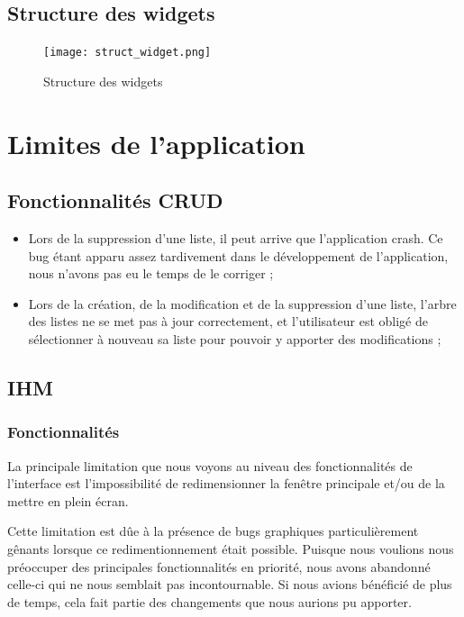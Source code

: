 	\newpage
	\section{Structure des widgets}
	
		\begin{figure}[h!]
			\centering
		   \texttt{[image: struct\_widget.png]}
		   \caption{Structure des widgets}
		\end{figure}
		\FloatBarrier
		
		
		
	
\chapter{Limites de l'application}
	
	\section{Fonctionnalités CRUD}
	
		\begin{itemize}
			\item Lors de la suppression d'une liste, il peut arrive que l'application crash. Ce bug étant apparu assez tardivement dans le développement de l'application, nous n'avons pas eu le temps de le corriger ;
			\item Lors de la création, de la modification et de la suppression d'une liste, l'arbre des listes ne se met pas à jour correctement, et l'utilisateur est obligé de sélectionner à nouveau sa liste pour pouvoir y apporter des modifications ;
		\end{itemize}
		
		
	\section{IHM}
	
		\subsection{Fonctionnalités}
			La principale limitation que nous voyons au niveau des fonctionnalités de l'interface est l'impossibilité de redimensionner la fenêtre principale et/ou de la mettre en plein écran.
			
			Cette limitation est dûe à la présence de bugs graphiques particulièrement gênants lorsque ce redimentionnement était possible. Puisque nous voulions nous préoccuper des principales fonctionnalités en priorité, nous avons abandonné celle-ci qui ne nous semblait pas incontournable. Si nous avions bénéficié de plus de temps, cela fait partie des changements que nous aurions pu apporter.\\
			
